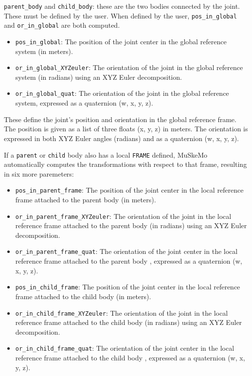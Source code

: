 \documentclass{article}
\begin{document}
\texttt{parent\_body} and \texttt{child\_body}: these are the two bodies connected by the joint. These must be defined by the user. When defined by the user, \texttt{pos\_in\_global} and \texttt{or\_in\_global} are both computed.

\begin{itemize}
    \item \texttt{pos\_in\_global}: The position of the joint center in the global reference system (in meters).
    \item \texttt{or\_in\_global\_XYZeuler}: The orientation of the joint in the global reference system (in radians) using an XYZ Euler decomposition.
    \item \texttt{or\_in\_global\_quat}: The orientation of the joint in the global reference system, expressed as a quaternion (w, x, y, z).
\end{itemize}

These define the joint's position and orientation in the global reference frame. The position is given as a list of three floats (x, y, z) in meters. The orientation is expressed in both XYZ Euler angles (radians) and as a quaternion (w, x, y, z).

If a \texttt{parent} or \texttt{child} body also has a local \texttt{FRAME} defined, MuSkeMo automatically computes the transformations with respect to that frame, resulting in six more paremeters:

\begin{itemize}
    \item \texttt{pos\_in\_parent\_frame}: The position of the joint center in the local reference frame attached to the parent body (in meters).
    \item \texttt{or\_in\_parent\_frame\_XYZeuler}: The orientation of the joint in the local reference frame attached to the parent body (in radians) using an XYZ Euler decomposition.
    \item \texttt{or\_in\_parent\_frame\_quat}: The orientation of the joint center in the local reference frame attached to the parent body , expressed as a quaternion (w, x, y, z).
    \item \texttt{pos\_in\_child\_frame}: The position of the joint center in the local reference frame attached to the child body (in meters).
    \item \texttt{or\_in\_child\_frame\_XYZeuler}: The orientation of the joint in the local reference frame attached to the child body (in radians) using an XYZ Euler decomposition.
    \item \texttt{or\_in\_child\_frame\_quat}: The orientation of the joint center in the local reference frame attached to the child body , expressed as a quaternion (w, x, y, z).
\end{itemize}
\end{document}
